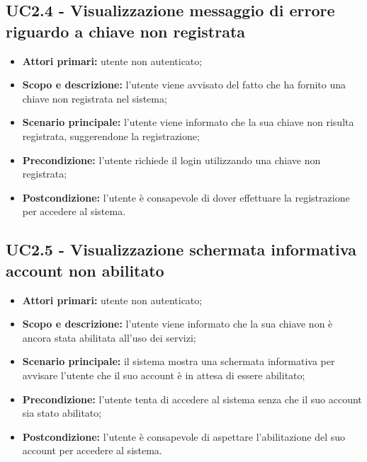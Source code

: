 \documentclass[AnalisiDeiRequisiti.tex]{subfiles}
\begin{document}
\subsection{UC2.4 - Visualizzazione messaggio di errore riguardo a chiave non registrata}
\begin{itemize}
	\item \textbf{Attori primari:} utente non autenticato;\\
	\item \textbf{Scopo e descrizione:} l'utente viene avvisato del fatto che ha fornito una chiave non registrata nel sistema;\\
	\item \textbf{Scenario principale:} l'utente viene informato che la sua chiave non risulta registrata, suggerendone la registrazione;\\
	\item \textbf{Precondizione:} l'utente richiede il login utilizzando una chiave non registrata;\\
	\item \textbf{Postcondizione:} l'utente è consapevole di dover effettuare la registrazione per accedere al sistema.\\
\end{itemize}
\subsection{UC2.5 - Visualizzazione schermata informativa account non abilitato}
\begin{itemize}
	\item \textbf{Attori primari:} utente non autenticato;
	\item \textbf{Scopo e descrizione:} l'utente viene informato che la sua chiave non è ancora stata abilitata all'uso dei servizi;
	\item \textbf{Scenario principale:} il sistema mostra una schermata informativa per avvisare l'utente che il suo account è in attesa di essere abilitato;
	\item \textbf{Precondizione:} l'utente tenta di accedere al sistema senza che il suo account sia stato abilitato; 
	\item \textbf{Postcondizione:} l'utente è consapevole di aspettare l'abilitazione del suo account per accedere al sistema.
\end{itemize}
\end{document}
